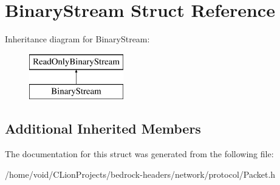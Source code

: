 \hypertarget{struct_binary_stream}{}\section{Binary\+Stream Struct Reference}
\label{struct_binary_stream}
Inheritance diagram for Binary\+Stream\+:\begin{figure}[H]
\begin{center}
\leavevmode
\includegraphics[height=2.000000cm]{struct_binary_stream}
\end{center}
\end{figure}
\subsection*{Additional Inherited Members}


The documentation for this struct was generated from the following file\+:\begin{DoxyCompactItemize}
\item 
/home/void/\+C\+Lion\+Projects/bedrock-\/headers/network/protocol/Packet.\+h\end{DoxyCompactItemize}
